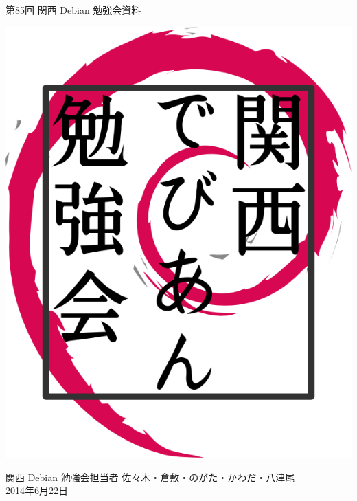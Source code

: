\documentclass[mingoth,a4paper]{jsarticle}
\newcommand{\debmtgyear}{2014}
\newcommand{\debmtgdate}{22}
\newcommand{\debmtgmonth}{6}
\newcommand{\debmtgnumber}{85}
\begin{document}
\begin{titlepage}


 第\debmtgnumber{}回 関西 Debian 勉強会資料

\vspace{2cm}

\begin{center}
\includegraphics{image200802/kansaidebianlogo.png}
\end{center}

\begin{flushright}
\hfill{}関西 Debian 勉強会担当者 佐々木・倉敷・のがた・かわだ・八津尾 \\
\hfill{}\debmtgyear{}年\debmtgmonth{}月\debmtgdate{}日
\end{flushright}

\thispagestyle{empty}
\end{titlepage}


\vspace{1em}
\end{document}
